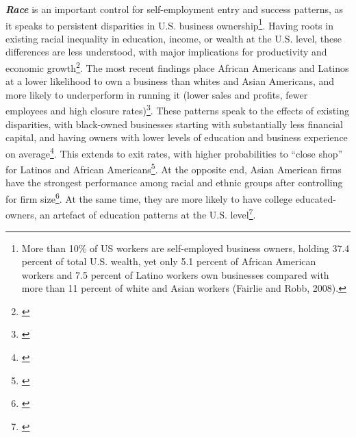 \textbf{\textit{Race}} is an important control for self-employment entry and success patterns, as it speaks to persistent disparities in U.S. business ownership\footnote{ More than 10\% of US workers are self-employed business owners, holding 37.4 percent of total U.S. wealth, yet only 5.1 percent of African American workers and 7.5 percent of Latino workers own businesses compared with more than 11 percent of white and Asian workers (Fairlie and Robb, 2008).}. Having roots in existing racial inequality in education, income, or wealth at the U.S. level, these differences are less understood, with major implications for productivity and economic growth\footnote{\cite{ReynoldsWhite1997}}. The most recent findings place African Americans and Latinos at a lower likelihood to own a business than whites and Asian Americans, and more likely to underperform in running it (lower sales and profits, fewer employees and high closure rates)\footnote{\cite{FairlieRobb2008}}. These patterns speak to the effects of existing disparities, with black-owned businesses starting with substantially less financial capital, and having owners with lower levels of education and business experience on average\footnote{\cite{FairlieRobb2008}}. This extends to exit rates, with higher probabilities to ``close shop'' for Latinos and African Americans\footnote{\cite{FairlieRobb2008}}. At the opposite end, Asian American firms have the strongest performance among racial and ethnic groups after controlling for firm size\footnote{\cite{FairlieRobb2008}}. At the same time, they are more likely to have college educated-owners, an artefact of education patterns at the U.S. level\footnote{\cite{FairlieRobb2008}}.

